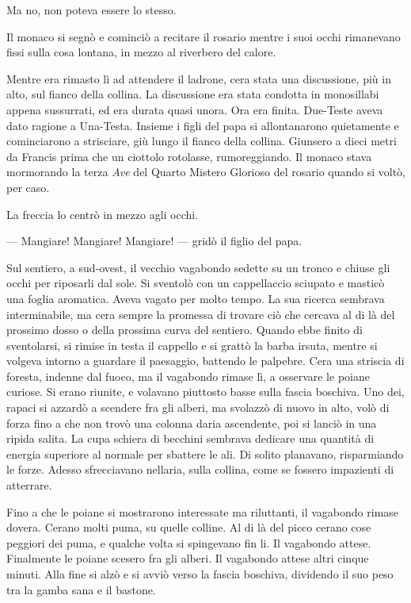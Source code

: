 Ma no, non poteva essere lo stesso.

Il monaco si segnò e cominciò a recitare il rosario mentre i suoi occhi
rimanevano fissi sulla cosa lontana, in mezzo al riverbero del calore.

Mentre era rimasto lì ad attendere il ladrone, c\textquotesingle era
stata una discussione, più in alto, sul fianco della collina. La
discussione era stata condotta in monosillabi appena sussurrati, ed era
durata quasi un\textquotesingle ora. Ora era finita. Due-Teste aveva
dato ragione a Una-Testa. Insieme i figli del papa si allontanarono
quietamente e cominciarono a strisciare, giù lungo il fianco della
collina. Giunsero a dieci metri da Francis prima che un ciottolo
rotolasse, rumoreggiando. Il monaco stava mormorando la terza \emph{Ave}
del Quarto Mistero Glorioso del rosario quando si voltò, per caso.

La freccia lo centrò in mezzo agli occhi.

--- Mangiare! Mangiare! Mangiare! --- gridò il figlio del papa.

Sul sentiero, a sud-ovest, il vecchio vagabondo sedette su un tronco e
chiuse gli occhi per riposarli dal sole. Si sventolò con un cappellaccio
sciupato e masticò una foglia aromatica. Aveva vagato per molto tempo.
La sua ricerca sembrava interminabile, ma c\textquotesingle era sempre
la promessa di trovare ciò che cercava al di là del prossimo dosso o
della prossima curva del sentiero. Quando ebbe finito di sventolarsi, si
rimise in testa il cappello e si grattò la barba irsuta, mentre si
volgeva intorno a guardare il paesaggio, battendo le palpebre.
C\textquotesingle era una striscia di foresta, indenne dal fuoco, ma il
vagabondo rimase lì, a osservare le poiane curiose. Si erano riunite, e
volavano piuttosto basse sulla fascia boschiva. Uno dei, rapaci si
azzardò a scendere fra gli alberi, ma svolazzò di nuovo in alto, volò di
forza fino a che non trovò una colonna d\textquotesingle aria
ascendente, poi si lanciò in una ripida salita. La cupa schiera di
becchini sembrava dedicare una quantità di energia superiore al normale
per sbattere le ali. Di solito planavano, risparmiando le forze. Adesso
sfrecciavano nell\textquotesingle aria, sulla collina, come se fossero
impazienti di atterrare.

Fino a che le poiane si mostrarono interessate ma riluttanti, il
vagabondo rimase dov\textquotesingle era. C\textquotesingle erano molti
puma, su quelle colline. Al di là del picco c\textquotesingle erano cose
peggiori dei puma, e qualche volta si spingevano fin li. Il vagabondo
attese. Finalmente le poiane scesero fra gli alberi. Il vagabondo attese
altri cinque minuti. Alla fine si alzò e si avviò verso la fascia
boschiva, dividendo il suo peso tra la gamba sana e il bastone.

